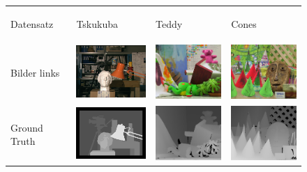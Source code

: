 \begin{figure}[h]
\centering
	\begin{tabular}{m{2cm} m{3.3cm} m{3.3cm} m{3.3cm}}
	{\scriptsize Datensatz}&
	\begin{center} {\scriptsize Tskukuba} \end{center} &
	\begin{center} {\scriptsize Teddy} \end{center} &
	\begin{center} {\scriptsize Cones} \end{center}
	\\
	{\scriptsize Bilder links} &
	\includegraphics[width=3cm]{img/disparity_images/left_tsukuba.png} & 
	\includegraphics[width=3cm]{img/disparity_images/left_teddy.png} & 
	\includegraphics[width=3cm]{img/disparity_images/left_cones.png} 
	\\ 
	{\scriptsize Ground Truth} &
	\includegraphics[width=3cm]{img/disparity_images/gt_tsukuba.png} & 
	\includegraphics[width=3cm]{img/disparity_images/gt_teddy.png} & 
	\includegraphics[width=3cm]{img/disparity_images/gt_cones.png} 

\end{tabular}
\end{figure}

